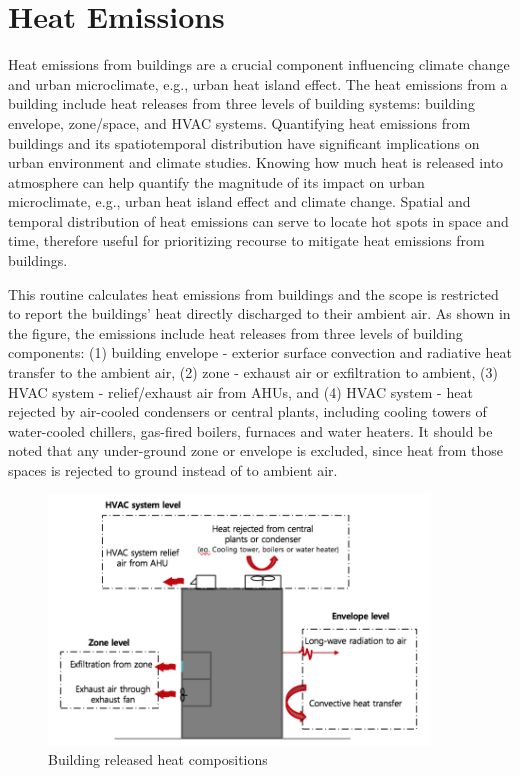 \section{Heat Emissions}\label{heat-emissions}

Heat emissions from buildings are a crucial component influencing climate change and urban microclimate, e.g., urban heat island effect. The heat emissions from a building include heat releases from three levels of building systems: building envelope, zone/space, and HVAC systems. Quantifying heat emissions from buildings and its spatiotemporal distribution have significant implications on urban environment and climate studies. Knowing how much heat is released into atmosphere can help quantify the magnitude of its impact on urban microclimate, e.g., urban heat island effect and climate change. Spatial and temporal distribution of heat emissions can serve to locate hot spots in space and time, therefore useful for prioritizing recourse to mitigate heat emissions from buildings.

This routine calculates heat emissions from buildings and the scope is restricted to report the buildings’ heat directly discharged to their ambient air. As shown in the figure, the emissions include heat releases from three levels of building components: (1) building envelope - exterior surface convection and radiative heat transfer to the ambient air, (2) zone - exhaust air or exfiltration to ambient, (3) HVAC system - relief/exhaust air from AHUs, and (4) HVAC system - heat rejected by air-cooled condensers or central plants, including cooling towers of water-cooled chillers, gas-fired boilers, furnaces and water heaters. It should be noted that any under-ground zone or envelope is excluded, since heat from those spaces is rejected to ground instead of to ambient air. 

\begin{figure}[hbtp] 
\centering
\includegraphics[width=0.9\textwidth, height=0.9\textheight, keepaspectratio=true]{media/heatemission.png}
\caption{Building released heat compositions \protect \label{fig:building-released-heat-compositions}}
\end{figure}

